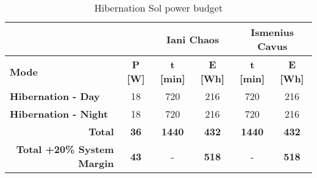 \begin{table}[h]
\footnotesize
\centering
\caption{Hibernation Sol power budget}
\label{tab:hibernation-sol-power-budget}
\begin{tabular}{lc|c|c|c|c|}
\cline{3-6}
 & \textbf{} & \multicolumn{2}{c|}{\textbf{Iani Chaos}} & \multicolumn{2}{c|}{\textbf{Ismenius Cavus}} \\ \hline
\multicolumn{1}{|l|}{\textbf{Mode}} & \textbf{P {[}W{]}} & \textbf{t {[}min{]}} & \textbf{E {[}Wh{]}} & \textbf{t {[}min{]}} & \textbf{E {[}Wh{]}} \\ \hline
\multicolumn{1}{|l|}{\textbf{Hibernation - Day}} & 18 & 720 & 216 & 720 & 216 \\ \hline
\multicolumn{1}{|l|}{\textbf{Hibernation - Night}} & 18 & 720 & 216 & 720 & 216 \\ \hline
\multicolumn{1}{|r|}{\textbf{Total}} & \textbf{36} & \textbf{1440} & \textbf{432} & \textbf{1440} & \textbf{432} \\ \hline
\multicolumn{1}{|r|}{\textbf{Total +20\% System Margin}} & \textbf{43} & - & \textbf{518} & - & \textbf{518} \\ \hline
\end{tabular}
\end{table}
